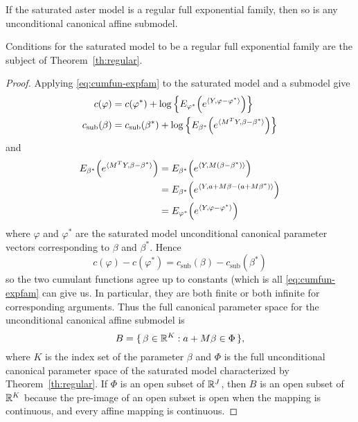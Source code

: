 \begin{theorem} \label{th:regular-submodel}
If the saturated aster model is a regular full exponential family,
then so is any unconditional canonical affine submodel.
\end{theorem}
Conditions for the saturated model to be a regular full exponential family
are the subject of Theorem~\ref{th:regular}.
\begin{proof}
Applying \eqref{eq:cumfun-expfam} to the saturated model and a submodel give
\begin{align*}
   c(\varphi)
   & =
   c(\varphi^*) + \log\left\{
   E_{\varphi^*}\Bigl( e^{\langle Y, \varphi - \varphi^* \rangle} \Bigr) \right\}
   \\
   c_\text{sub}(\beta)
   & =
   c_\text{sub}(\beta^*) + \log\left\{
   E_{\beta^*}\Bigl( e^{\langle M^T Y, \beta - \beta^* \rangle} \Bigr) \right\}
\end{align*}
and
\begin{align*}
   E_{\beta^*}\Bigl( e^{\langle M^T Y, \beta - \beta^* \rangle} \Bigr)
   & =
   E_{\beta^*}\Bigl( e^{\langle Y, M (\beta - \beta^*) \rangle} \Bigr)
   \\
   & =
   E_{\beta^*}\Bigl( e^{\langle Y, a + M \beta - (a + M \beta^*) \rangle} \Bigr)
   \\
   & =
   E_{\varphi^*}\Bigl( e^{\langle Y, \varphi - \varphi^* \rangle} \Bigr)
\end{align*}
where $\varphi$ and $\varphi^*$ are the saturated model unconditional
canonical parameter vectors corresponding to $\beta$ and $\beta^*$.
Hence
$$
   c(\varphi) - c(\varphi^*) = c_\text{sub}(\beta) - c_\text{sub}(\beta^*)
$$
so the two cumulant functions agree up to constants
(which is all \eqref{eq:cumfun-expfam} can give us.
In particular, they are both finite or both infinite for corresponding
arguments.  Thus the full canonical parameter space for the unconditional
canonical affine submodel is
$$
   B = \{\,  \beta \in \mathbb{R}^K : a + M \beta \in \Phi  \,\},
$$
where $K$ is the index set of the parameter $\beta$ and $\Phi$ is the
full unconditional canonical parameter space of the saturated model
characterized by Theorem~\ref{th:regular}.  If $\Phi$ is an open subset
of $\mathbb{R}^J$, then $B$ is an open subset of $\mathbb{R}^K$ because the pre-image
of an open subset is open when the mapping is continuous, and every affine
mapping is continuous.
\end{proof}

